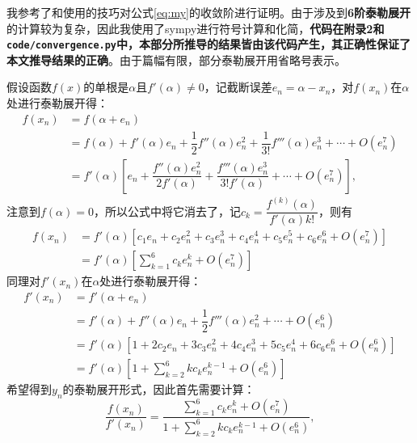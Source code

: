 我参考了\cite{kou2006modified}和\cite{eftekhari2014new}使用的技巧对公式\ref{eq:my}的收敛阶进行证明。由于涉及到\textbf{6阶泰勒展开}的计算较为复杂，因此我使用了sympy\footnotemark[1]进行符号计算和化简，\textbf{代码在附录2和\texttt{code/convergence.py}中，本部分所推导的结果皆由该代码产生，其正确性保证了本文推导结果的正确}。由于篇幅有限，部分泰勒展开用省略号表示。

假设函数$f(x)$的单根是$\alpha$且$f'(\alpha)\neq 0$，记截断误差$e_n = \alpha - x_n$，对$f(x_n)$在$\alpha$处进行泰勒展开得：
\begin{equation}
    \label{eq:fx-taylor}
    \begin{aligned}
        f(x_n) &= f(\alpha + e_n) \\
        &= f(\alpha) + f'(\alpha)e_n + \dfrac{1}{2}f''(\alpha)e_n^2+\dfrac{1}{3!}f'''(\alpha)e_n^3+ \cdots + O(e_n^7) \\
        &= f'(\alpha)\left[e_n + \dfrac{f''(\alpha)e_n^2}{2f'(\alpha)}+\dfrac{f'''(\alpha)e_n^3}{3!f'(\alpha)} + \cdots + O(e_n^7) \right],
    \end{aligned}
\end{equation}
注意到$f(\alpha)=0$，所以公式中将它消去了，记$c_k=\dfrac{f^{(k)}(\alpha)}{f'(\alpha)k!}$，则有
\begin{equation}
    \begin{aligned}
        f(x_n) &= f'(\alpha)\left[c_1e_n + c_2e_n^2 + c_3e_n^3 + c_4e_n^4 + c_5e_n^5 + c_6e_n^6 + O(e_n^7)\right] \\
        &= f'(\alpha)\left[ \sum\limits_{k=1}^6 c_ke_n^k + O(e_n^7) \right]
    \end{aligned}
\end{equation}
同理对$f'(x_n)$在$\alpha$处进行泰勒展开得：
\begin{equation}
    \label{eq:dx}
    \begin{aligned}
        f'(x_n) &= f'(\alpha + e_n)\\
        &= f'(\alpha) + f''(\alpha)e_n + \dfrac{1}{2}f'''(\alpha)e_n^2 + \cdots + O(e_n^6) \\
        &=f'(\alpha) [1 + 2c_2e_n + 3c_3e_n^2 + 4c_4e_n^3 + 5c_5e_n^4 + 6c_6e_n^6 + O(e_n^6)] \\
        &= f'(\alpha) \left[ 1 + \sum\limits_{k=2}^6 kc_ke_n^{k-1} + O(e_n^6) \right]
    \end{aligned}
\end{equation}
希望得到$y_n$的泰勒展开形式，因此首先需要计算：
\begin{equation}
    \label{eq:fx-div-dx}
    \dfrac{f(x_n)}{f'(x_n)} = \dfrac{\sum\limits_{k=1}^6 c_ke_n^k + O(e_n^7)}{1 + \sum\limits_{k=2}^6 kc_ke_n^{k-1} + O(e_n^6) },
\end{equation}
